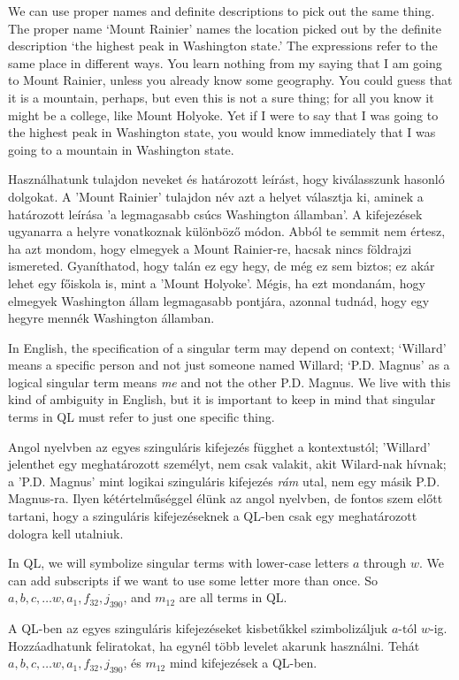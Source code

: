 We can use proper names and definite descriptions to pick out the same thing. The proper name `Mount Rainier' names the location picked out by the definite description `the highest peak in Washington state.' The expressions refer to the same place in different ways. You learn nothing from my saying that I am going to Mount Rainier, unless you already know some geography. You could guess that it is a mountain, perhaps, but even this is not a sure thing; for all you know it might be a college, like Mount Holyoke. Yet if I were to say that I was going to the highest peak in Washington state, you would know immediately that I was going to a mountain in Washington state.

Használhatunk tulajdon neveket és határozott leírást, hogy kiválasszunk hasonló dolgokat. A ’Mount Rainier’ tulajdon név azt a helyet választja ki, aminek a határozott leírása ’a legmagasabb csúcs Washington államban’. A kifejezések ugyanarra a helyre vonatkoznak különböző módon. Abból te semmit nem értesz, ha azt mondom, hogy elmegyek a Mount Rainier-re, hacsak nincs földrajzi ismereted. Gyaníthatod, hogy talán ez egy hegy, de még ez sem biztos; ez akár lehet egy főiskola is, mint a ’Mount Holyoke’. Mégis, ha ezt mondanám, hogy elmegyek Washington állam legmagasabb pontjára, azonnal tudnád, hogy egy hegyre mennék Washington államban.

In English, the specification of a singular term may depend on context; `Willard' means a specific person and not just someone named Willard; `P.D. Magnus' as a logical singular term means \emph{me} and not the other P.D. Magnus. We live with this kind of ambiguity in English, but it is important to keep in mind that singular terms in QL must refer to just one specific thing.

Angol nyelvben az egyes szinguláris kifejezés függhet a kontextustól; ’Willard’ jelenthet egy meghatározott személyt, nem csak valakit, akit Wilard-nak hívnak; a ’P.D. Magnus’ mint logikai szinguláris kifejezés \emph{rám} utal, nem egy másik P.D. Magnus-ra. Ilyen kétértelműséggel élünk az angol nyelvben, de fontos szem előtt tartani, hogy a szinguláris kifejezéseknek a QL-ben csak egy meghatározott dologra kell utalniuk.

In QL, we will symbolize singular terms with lower-case letters $a$ through $w$. We can add subscripts if we want to use some letter more than once. So $a,b,c,\ldots w, a_1, f_{32}, j_{390}$, and $m_{12}$ are all terms in QL.

A QL-ben az egyes szinguláris kifejezéseket kisbetűkkel szimbolizáljuk $a$-tól $w$-ig. Hozzáadhatunk feliratokat, ha egynél több levelet akarunk használni. Tehát $a,b,c,\ldots w, a_1, f_{32}, j_{390}$, és $m_{12}$ mind kifejezések a QL-ben.

